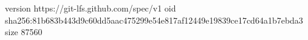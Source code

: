 version https://git-lfs.github.com/spec/v1
oid sha256:81b683b443d9c60dd5aac475299e54e817af12449e19839ce17cd64a1b7ebda3
size 87560
